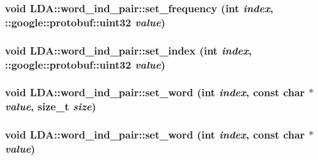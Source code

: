 \label{class_l_d_a_1_1word__ind__pair_a8efc628f46d368ee24f5ca74fcb7993d}
\hypertarget{class_l_d_a_1_1word__ind__pair_adfbb9f67c44e1edff7397dc83e7363fc}{
\subsubsection[{set\_\-frequency}]{\setlength{\rightskip}{0pt plus 5cm}void LDA::word\_\-ind\_\-pair::set\_\-frequency (int {\em index}, \/  ::google::protobuf::uint32 {\em value})}}
\label{class_l_d_a_1_1word__ind__pair_adfbb9f67c44e1edff7397dc83e7363fc}
\hypertarget{class_l_d_a_1_1word__ind__pair_ab6c4d76c1d1ae047a73e81e7b1416adf}{
\subsubsection[{set\_\-index}]{\setlength{\rightskip}{0pt plus 5cm}void LDA::word\_\-ind\_\-pair::set\_\-index (int {\em index}, \/  ::google::protobuf::uint32 {\em value})}}
\label{class_l_d_a_1_1word__ind__pair_ab6c4d76c1d1ae047a73e81e7b1416adf}
\hypertarget{class_l_d_a_1_1word__ind__pair_a239007875834e3dc60e652d5f5cebccc}{
\subsubsection[{set\_\-word}]{\setlength{\rightskip}{0pt plus 5cm}void LDA::word\_\-ind\_\-pair::set\_\-word (int {\em index}, \/  const char $\ast$ {\em value}, \/  size\_\-t {\em size})}}
\label{class_l_d_a_1_1word__ind__pair_a239007875834e3dc60e652d5f5cebccc}
\hypertarget{class_l_d_a_1_1word__ind__pair_ae4257eb3fbf2a14ab6c4037a4146f877}{
\subsubsection[{set\_\-word}]{\setlength{\rightskip}{0pt plus 5cm}void LDA::word\_\-ind\_\-pair::set\_\-word (int {\em index}, \/  const char $\ast$ {\em value})}}
